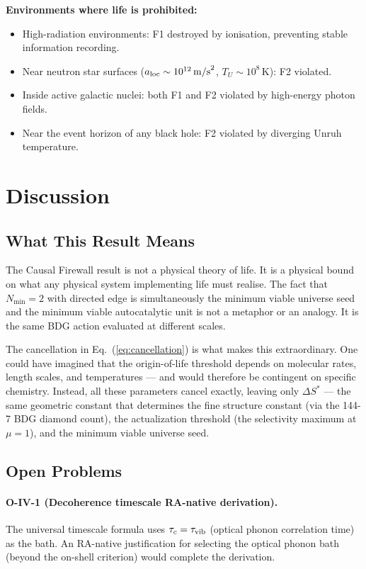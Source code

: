 \documentclass[12pt,a4paper]{article}
\begin{document}
\textbf{Environments where life is prohibited:}
\begin{itemize}
  \item High-radiation environments: F1 destroyed by ionisation, preventing stable information recording.
  \item Near neutron star surfaces ($a_{\rm loc}\sim10^{12}\,\mathrm{m/s}^2$, $T_U\sim10^8\,\mathrm{K}$): F2 violated.
  \item Inside active galactic nuclei: both F1 and F2 violated by high-energy photon fields.
  \item Near the event horizon of any black hole: F2 violated by diverging Unruh temperature.
\end{itemize}

\section{Discussion}\label{sec:discussion}

\subsection{What This Result Means}

The Causal Firewall result is not a physical theory of life.  It is a physical bound on what any physical system implementing life must realise.  The fact that $N_{\min}=2$ with directed edge is simultaneously the minimum viable universe seed and the minimum viable autocatalytic unit is not a metaphor or an analogy.  It is the same BDG action evaluated at different scales.

The cancellation in Eq.~(\ref{eq:cancellation}) is what makes this extraordinary.  One could have imagined that the origin-of-life threshold depends on molecular rates, length scales, and temperatures --- and would therefore be contingent on specific chemistry.  Instead, all these parameters cancel exactly, leaving only $\Delta S^*$ --- the same geometric constant that determines the fine structure constant (via the 144-7 BDG diamond count), the actualization threshold (the selectivity maximum at $\mu=1$), and the minimum viable universe seed.

\subsection{Open Problems}

\paragraph{O-IV-1 (Decoherence timescale RA-native derivation).}  The universal timescale formula uses $\tau_c=\tau_{\rm vib}$ (optical phonon correlation time) as the bath.  An RA-native justification for selecting the optical phonon bath (beyond the on-shell criterion) would complete the derivation.
\end{document}
